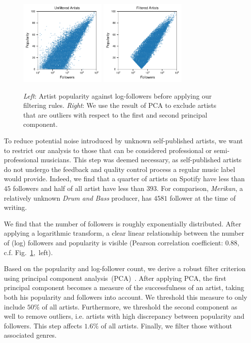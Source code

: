 \documentclass{article}
\begin{document}
\begin{figure}[t]
  \centering
  \includegraphics[width=0.38\textwidth]{../figures/artists_unfiltered.pdf}
  \qquad
  \includegraphics[width=0.38\textwidth]{../figures/artists_filtered.pdf}
  \caption{\textit{Left}: Artist popularity against log-followers before applying our filtering rules. \textit{Right}: We use the result of PCA to exclude artists that are outliers with respect to the first and second principal component.}
  \label{fig:filtering}
\end{figure}

To reduce potential noise introduced by unknown self-published artists, we want to restrict our analysis to those that can be considered professional or semi-professional musicians. This step was deemed necessary, as self-published artists do not undergo the feedback and quality control process a regular music label would provide. Indeed, we find that a quarter of artists on Spotify have less than $45$ followers and half of all artist have less than $393$. For comparison, \emph{Merikan}, a relatively unknown \emph{Drum and Bass} producer, has $4581$ follower at the time of writing.

We find that the number of followers is roughly exponentially distributed. After applying a logarithmic transform, a clear linear relationship between the number of (log) followers and popularity is visible (Pearson correlation coefficient: $0.88$, c.f. Fig.~\ref{fig:filtering},~left). 

Based on the popularity and log-follower count, we derive a robust filter criterion using principal component analysis~(PCA)~\cite{jolliffe2016principal}. After applying PCA, the first principal component becomes a measure of the successfulness of an artist, taking both his popularity and followers into account. We threshold this measure to only include $50\%$ of all artists. Furthermore, we threshold the second component as well to remove outliers, i.e. artists with high discrepancy between popularity and followers. This step affects $1.6\%$ of all artists. Finally, we filter those without associated genres.
\end{document}
